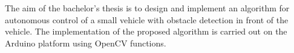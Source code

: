 The aim of the bachelor's thesis is to design and implement an algorithm for autonomous control of a small vehicle with obstacle detection in front of the vehicle. The implementation of the proposed algorithm is carried out on the Arduino platform using OpenCV functions.
